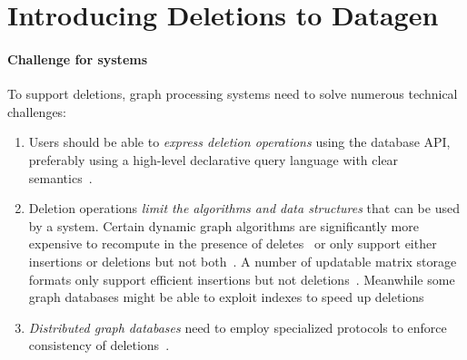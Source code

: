 \section{Introducing Deletions to Datagen}

\paragraph{Challenge for systems}

To support deletions, graph processing systems need to solve numerous technical challenges:
%
\begin{enumerate}
    \item Users should be able to \emph{express deletion operations} using the database API, preferably using a high-level declarative query language with clear semantics~\cite{Green2019}.
    \item Deletion operations \emph{limit the algorithms and data structures} that can be used by a system.
    Certain dynamic graph algorithms are significantly more expensive to recompute in the presence of deletes~\cite{DBLP:conf/soda/Roditty13} or only support either insertions or deletions but not both~\cite{DBLP:conf/esa/RodittyZ04}.
    A number of updatable matrix storage formats only support efficient insertions but not deletions~\cite{DBLP:conf/hpec/BusatoGBB18}.
    Meanwhile some graph databases might be able to exploit indexes to speed up deletions~\cite[Sec.~4.4.2]{Besta2019}
    \item \emph{Distributed graph databases} need to employ specialized protocols to enforce consistency of deletions~\cite{Waudby2020}.
\end{enumerate}

